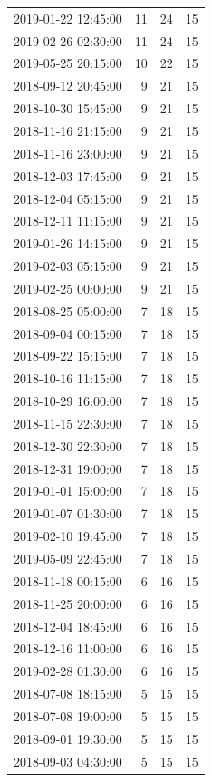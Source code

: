 \begin{tabular}{lrrr}
2019-01-22 12:45:00 & 11 & 24 & 15 \\
2019-02-26 02:30:00 & 11 & 24 & 15 \\
2019-05-25 20:15:00 & 10 & 22 & 15 \\
2018-09-12 20:45:00 & 9 & 21 & 15 \\
2018-10-30 15:45:00 & 9 & 21 & 15 \\
2018-11-16 21:15:00 & 9 & 21 & 15 \\
2018-11-16 23:00:00 & 9 & 21 & 15 \\
2018-12-03 17:45:00 & 9 & 21 & 15 \\
2018-12-04 05:15:00 & 9 & 21 & 15 \\
2018-12-11 11:15:00 & 9 & 21 & 15 \\
2019-01-26 14:15:00 & 9 & 21 & 15 \\
2019-02-03 05:15:00 & 9 & 21 & 15 \\
2019-02-25 00:00:00 & 9 & 21 & 15 \\
2018-08-25 05:00:00 & 7 & 18 & 15 \\
2018-09-04 00:15:00 & 7 & 18 & 15 \\
2018-09-22 15:15:00 & 7 & 18 & 15 \\
2018-10-16 11:15:00 & 7 & 18 & 15 \\
2018-10-29 16:00:00 & 7 & 18 & 15 \\
2018-11-15 22:30:00 & 7 & 18 & 15 \\
2018-12-30 22:30:00 & 7 & 18 & 15 \\
2018-12-31 19:00:00 & 7 & 18 & 15 \\
2019-01-01 15:00:00 & 7 & 18 & 15 \\
2019-01-07 01:30:00 & 7 & 18 & 15 \\
2019-02-10 19:45:00 & 7 & 18 & 15 \\
2019-05-09 22:45:00 & 7 & 18 & 15 \\
2018-11-18 00:15:00 & 6 & 16 & 15 \\
2018-11-25 20:00:00 & 6 & 16 & 15 \\
2018-12-04 18:45:00 & 6 & 16 & 15 \\
2018-12-16 11:00:00 & 6 & 16 & 15 \\
2019-02-28 01:30:00 & 6 & 16 & 15 \\
2018-07-08 18:15:00 & 5 & 15 & 15 \\
2018-07-08 19:00:00 & 5 & 15 & 15 \\
2018-09-01 19:30:00 & 5 & 15 & 15 \\
2018-09-03 04:30:00 & 5 & 15 & 15 \\

\end{tabular}
